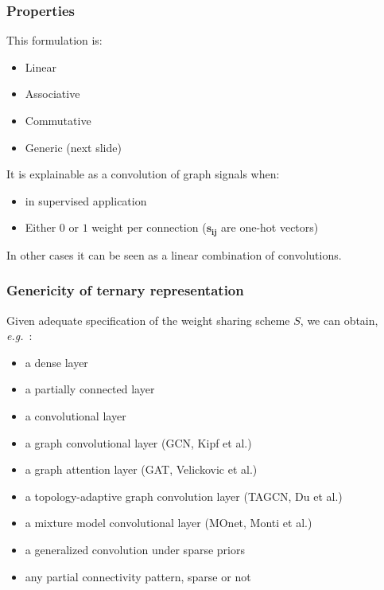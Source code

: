 \documentclass[t,9pt,pdftex]{beamer}
\theoremstyle{definition}
\newcommand{\eg}{\emph{e.g.}~}
\begin{document}
\begin{frame}[c, label=current]
\begin{columns}
  \end{columns}
\end{frame}


\begin{frame}[c, label=current]
  \frametitle{Properties}
  This formulation is:
  \begin{itemize}
    \item Linear
    \item Associative
    \item Commutative
    \item Generic (next slide)
  \end{itemize}
  It is explainable as a convolution of graph signals when:
  \begin{itemize}
    \item in supervised application
    \item Either $0$ or $1$ weight per connection ($\mathbf{s_{ij}}$ are one-hot vectors)
  \end{itemize}
  In other cases it can be seen as a linear combination of convolutions.
\end{frame}

\begin{frame}[c, label=current]
  \frametitle{Genericity of ternary representation}
  Given adequate specification of the weight sharing scheme $S$, we can obtain, \eg:
  \begin{itemize}
    \item a dense layer
    \item a partially connected layer
    \item a convolutional layer
    \item a graph convolutional layer (GCN, Kipf et al.)
    \item a graph attention layer (GAT, Velickovic et al.)
    \item a topology-adaptive graph convolution layer (TAGCN, Du et al.)
    \item a mixture model convolutional layer (MOnet, Monti et al.)
    \item a generalized convolution under sparse priors
    \item any partial connectivity pattern, sparse or not
  \end{itemize}
\end{frame}
\end{document}
